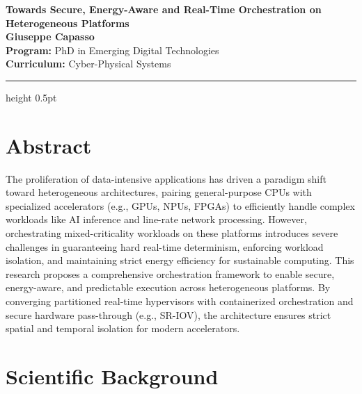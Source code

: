 \documentclass[11pt,a4paper]{article}
\newcommand{\proposaltitle}[1]{
    \begin{center}
        \vspace*{0.1cm}
        {\LARGE \bfseries \color{santannablue} #1} \\[1.5ex]
        {\large \textbf{Giuseppe Capasso}} \\[1ex]
        \small{
            \vspace{0.1cm}
            \textbf{Program:} PhD in Emerging Digital Technologies\\
            \textbf{Curriculum:} Cyber-Physical Systems\\ %
        }
    \end{center}
    \vspace{0.3cm}
    \hrule height 0.5pt
    \vspace{0.5cm}
}
\begin{document}
\proposaltitle{Towards Secure, Energy-Aware and Real-Time Orchestration on Heterogeneous Platforms}

\section*{Abstract}
The proliferation of data-intensive applications has driven a paradigm shift toward heterogeneous architectures, pairing general-purpose CPUs with specialized accelerators (e.g., GPUs, NPUs, FPGAs) to efficiently handle complex workloads like AI inference and line-rate network processing. However, orchestrating mixed-criticality workloads on these platforms introduces severe challenges in guaranteeing hard real-time determinism, enforcing workload isolation, and maintaining strict energy efficiency for sustainable computing. This research proposes a comprehensive orchestration framework to enable secure, energy-aware, and predictable execution across heterogeneous platforms. By converging partitioned real-time hypervisors with containerized orchestration and secure hardware pass-through (e.g., SR-IOV), the architecture ensures strict spatial and temporal isolation for modern accelerators.

\section{Scientific Background}
\label{sec:background}
\end{document}
